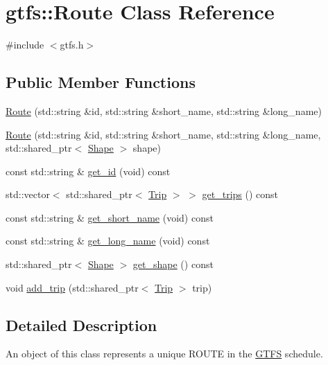\hypertarget{classgtfs_1_1Route}{}\section{gtfs\+:\+:Route Class Reference}
\label{classgtfs_1_1Route}


{\ttfamily \#include $<$gtfs.\+h$>$}

\subsection*{Public Member Functions}
\begin{DoxyCompactItemize}
\item 
\hyperlink{classgtfs_1_1Route_a32550fdfee780a26c596172184b86148}{Route} (std\+::string \&id, std\+::string \&short\+\_\+name, std\+::string \&long\+\_\+name)
\item 
\hyperlink{classgtfs_1_1Route_aa216efacee7f9eeab810e044894d3ec0}{Route} (std\+::string \&id, std\+::string \&short\+\_\+name, std\+::string \&long\+\_\+name, std\+::shared\+\_\+ptr$<$ \hyperlink{classgtfs_1_1Shape}{Shape} $>$ shape)
\item 
const std\+::string \& \hyperlink{classgtfs_1_1Route_a2d1ee4193b52ab7b8c7eb3160850cf71}{get\+\_\+id} (void) const
\item 
std\+::vector$<$ std\+::shared\+\_\+ptr$<$ \hyperlink{classgtfs_1_1Trip}{Trip} $>$ $>$ \hyperlink{classgtfs_1_1Route_a763ea7a09f20972019198515da6a1c05}{get\+\_\+trips} () const
\item 
const std\+::string \& \hyperlink{classgtfs_1_1Route_a2a0fcdf687d5e326b20c5043c9db874f}{get\+\_\+short\+\_\+name} (void) const
\item 
const std\+::string \& \hyperlink{classgtfs_1_1Route_aa943d312f934a91c3a56aec19d51cc90}{get\+\_\+long\+\_\+name} (void) const
\item 
std\+::shared\+\_\+ptr$<$ \hyperlink{classgtfs_1_1Shape}{Shape} $>$ \hyperlink{classgtfs_1_1Route_a4d3d7b29be342ae806041801327762a8}{get\+\_\+shape} () const
\item 
void \hyperlink{classgtfs_1_1Route_aa8a666e5a8f197835764874c983e6601}{add\+\_\+trip} (std\+::shared\+\_\+ptr$<$ \hyperlink{classgtfs_1_1Trip}{Trip} $>$ trip)
\end{DoxyCompactItemize}


\subsection{Detailed Description}
An object of this class represents a unique R\+O\+U\+TE in the \hyperlink{classgtfs_1_1GTFS}{G\+T\+FS} schedule.

